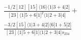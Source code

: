 \documentclass[varwidth, border=5pt]{standalone}
\begin{document}
\begin{my}
$\begin{gathered}
\scriptscriptstyle\frac{-1/2[12][15]⟨16⟩⟨1|3+4|2]}{[23]⟨1|5+6|1]^2⟨1|2+3|4]}+\\
\scriptscriptstyle\frac{-3/2[15]⟨1|3+4|2]⟨6|1+5|2]}{[23]⟨1|5+6|1]⟨1|2+3|4]s_{234}}\phantom{+}
\end{gathered}$
\end{my}
\end{document}
